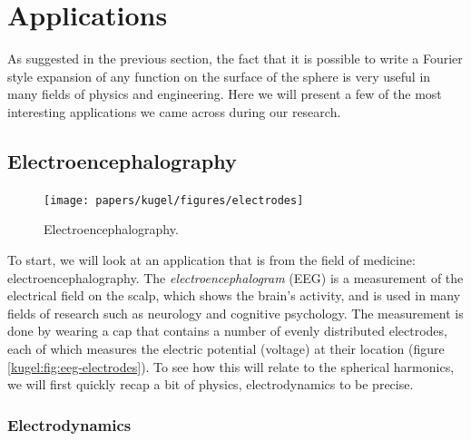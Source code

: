 
\section{Applications}

As suggested in the previous section, the fact that it is possible to write a
Fourier style expansion of any function on the surface of the sphere is very
useful in many fields of physics and engineering. Here we will present a few of
the most interesting applications we came across during our research.

\subsection{Electroencephalography}

\begin{figure}
  \centering
    {\texttt{[image: papers/kugel/figures/electrodes]}}
  \qquad
  \caption{
    Electroencephalography.
    \label{kugel:fig:eeg}
  }
\end{figure}

To start, we will look at an application that is from the field of medicine:
electroencephalography. The \emph{electroencephalogram} (EEG) is a measurement
of the electrical field on the scalp, which shows the brain's activity, and is
used in many fields of research such as neurology and cognitive psychology.  The
measurement is done by wearing a cap that contains a number of evenly
distributed electrodes, each of which measures the electric potential (voltage)
at their location (figure \ref{kugel:fig:eeg-electrodes}).  To see how this will
relate to the spherical harmonics, we will first quickly recap a bit of physics,
electrodynamics to be precise.

\subsubsection{Electrodynamics}

